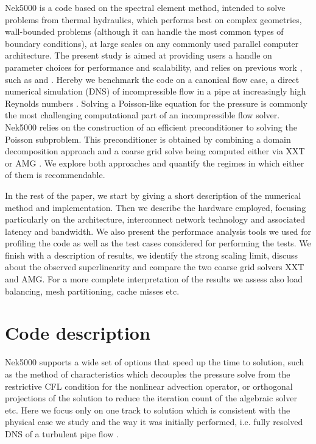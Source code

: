 \documentclass{sig-alternate}
\begin{document}
Nek5000 is a code based on the spectral element method, intended to solve problems
from thermal hydraulics, which performs best on
complex geometries, wall-bounded problems (although it can handle the most common types of
boundary conditions), at large scales on any commonly used parallel computer
architecture. The present study is aimed at providing users a handle on
parameter choices for performance and scalability, and relies on previous work ,
such as \cite{fischer:scaling} and \cite{tufo:terascale}. Hereby we benchmark
the code on a canonical flow case, a direct numerical simulation (DNS) of
incompressible flow in a pipe at increasingly high Reynolds numbers
\cite{Khoury2013}. Solving a Poisson-like equation for the
pressure is commonly the most challenging computational part of an incompressible flow
solver. Nek5000 relies on the construction of an efficient preconditioner to solving the Poisson
subproblem. This preconditioner is obtained by combining a domain decomposition 
approach and a coarse grid solve being computed either via XXT \cite{Tufo2001151} 
or AMG \cite{LottesAMG}. We explore both 
approaches and quantify the regimes in which either of them is recommendable. 

In the rest of the paper, we start by giving a short description of the numerical method
and implementation. Then we describe the hardware employed, focusing particularly on
the architecture, interconnect network technology and associated latency and
bandwidth. We also present the performace analysis tools we used for profiling the code
as well as the test cases considered for performing the tests. We finish with a 
description of results, we identify the strong scaling limit, discuss about the
observed superlinearity and compare the two coarse grid solvers XXT and AMG. For 
a more complete interpretation of the results we assess also load balancing, 
mesh partitioning, cache misses etc. 


\section{Code description}
Nek5000 supports a wide set of options that speed up the time to solution, such
as the method of characteristics which decouples the pressure solve from the
restrictive CFL condition for the nonlinear advection operator, or orthogonal
projections of the solution to reduce the iteration count of the algebraic
solver etc. Here we focus only on one track to solution which is consistent with
the physical case we study and the way it was initially performed, i.e. fully 
resolved DNS of a turbulent pipe flow \cite{Khoury2013}.
\end{document}
